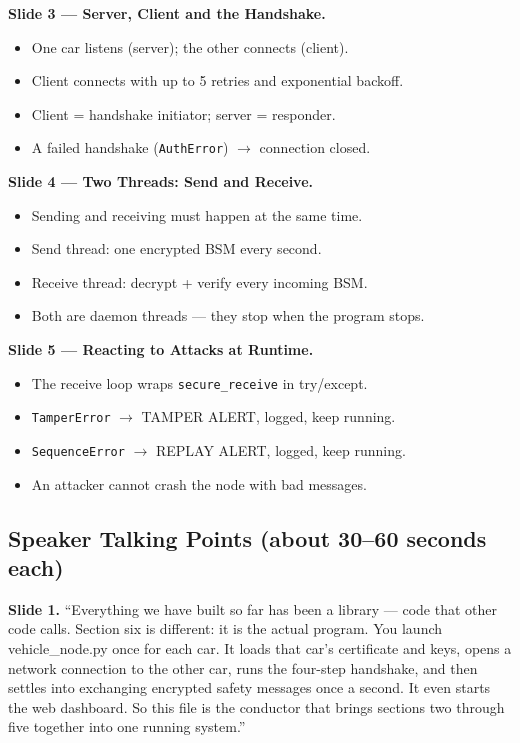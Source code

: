 \documentclass[11pt,a4paper]{report}
\begin{document}
\textbf{Slide 3 --- Server, Client and the Handshake.}
\begin{itemize}
  \item One car listens (server); the other connects (client).
  \item Client connects with up to 5 retries and exponential backoff.
  \item Client = handshake initiator; server = responder.
  \item A failed handshake (\texttt{AuthError}) $\to$ connection closed.
\end{itemize}

\textbf{Slide 4 --- Two Threads: Send and Receive.}
\begin{itemize}
  \item Sending and receiving must happen at the same time.
  \item Send thread: one encrypted BSM every second.
  \item Receive thread: decrypt + verify every incoming BSM.
  \item Both are daemon threads --- they stop when the program stops.
\end{itemize}

\textbf{Slide 5 --- Reacting to Attacks at Runtime.}
\begin{itemize}
  \item The receive loop wraps \texttt{secure\_receive} in try/except.
  \item \texttt{TamperError} $\to$ TAMPER ALERT, logged, keep running.
  \item \texttt{SequenceError} $\to$ REPLAY ALERT, logged, keep running.
  \item An attacker cannot crash the node with bad messages.
\end{itemize}

\subsection{Speaker Talking Points (about 30--60 seconds each)}

\textbf{Slide 1.} ``Everything we have built so far has been a library --- code
that other code calls. Section six is different: it is the actual program. You
launch vehicle\_node.py once for each car. It loads that car's certificate and
keys, opens a network connection to the other car, runs the four-step handshake,
and then settles into exchanging encrypted safety messages once a second. It even
starts the web dashboard. So this file is the conductor that brings sections two
through five together into one running system.''
\end{document}

